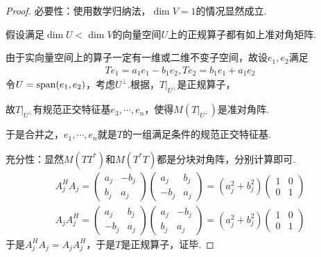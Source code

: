 \begin{proof}
    必要性：使用数学归纳法，\(\dim V=1\)的情况显然成立.

    假设满足\(\dim U<\dim V\)的向量空间\(U\)上的正规算子都有如上准对角矩阵.
    
    由于实向量空间上的算子一定有一维或二维不变子空间，故设\(e_1,e_2\)满足
        \begin{align*}
            Te_1=a_1e_1-b_1e_2,Te_2=b_1e_1+a_1e_2
        \end{align*}
    令\(U=\operatorname{span}(e_1,e_2)\)，考虑\(U^\bot\).根据，\(T|_{U^\bot}\)是正规算子，
    
    故\(T|_{U^\bot}\)有规范正交特征基\(e_3,\cdots,e_n\)，使得\(M(T|_{U^\bot})\)是准对角阵.
    
    于是合并之，\(e_1,\cdots,e_n\)就是\(T\)的一组满足条件的规范正交特征基.
    
    充分性：显然\(M(TT^*)\)和\(M(T^*T)\)都是分块对角阵，分别计算即可.
    \begin{align*}
        A_j^H A_j=
        \begin{pmatrix}
            a_j & -b_j \\
            b_j & a_j
        \end{pmatrix}
        \begin{pmatrix}
            a_j  & b_j \\
            -b_j & a_j
        \end{pmatrix}
        =(a_j^2+b_j^2)
        \begin{pmatrix}
            1 & 0 \\
            0 & 1
        \end{pmatrix} \\
        A_j A_j^H=
        \begin{pmatrix}
            a_j  & b_j \\
            -b_j & a_j
        \end{pmatrix}
        \begin{pmatrix}
            a_j & -b_j \\
            b_j & a_j
        \end{pmatrix}
        =(a_j^2+b_j^2)
        \begin{pmatrix}
            1 & 0 \\
            0 & 1
        \end{pmatrix}
    \end{align*}
    于是\(A_j^H A_j=A_j A_j^H\)，于是\(T\)是正规算子，证毕.
\end{proof}

